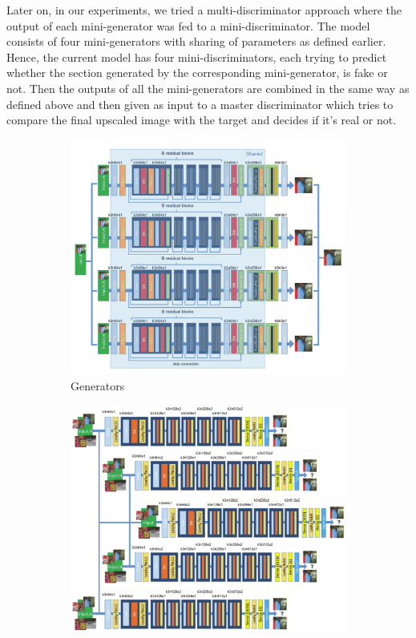 \documentclass[12pt,a4paper,twocolumn]{article}
\begin{document}
        Later on, in our experiments, we tried a multi-discriminator approach where the output of each mini-generator was fed to a mini-discriminator.
        The model consists of four mini-generators with sharing of parameters as defined earlier.
        Hence, the current model has four mini-discriminators, each trying to predict whether the section generated by the corresponding mini-generator, is fake or not.
        Then the outputs of all the mini-generators are combined in the same way as defined above and then given as input to a master discriminator which tries to compare the final upscaled image with the target and decides if it's real or not.

        \begin{figure}
            \centering
            \begin{subfigure}{0.4\textwidth}
                \includegraphics[width=\textwidth]{images/mad-srgan-gen-arch.png}
                \caption{Generators}
            \end{subfigure}
            \begin{subfigure}{0.4\textwidth}
                \includegraphics[width=\textwidth]{images/mad-srgan-disc-arch.png}

\end{subfigure}
\end{figure}
\end{document}
